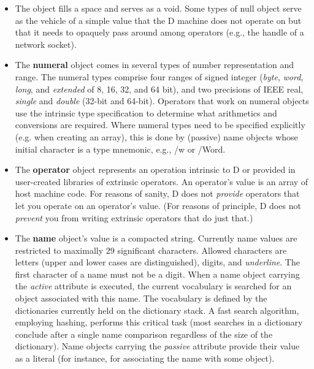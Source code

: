 \begin{itemize}

\item The  object fills a space and serves as a void. Some
  types of null object serve as the vehicle of a simple value that the
  D machine does not operate on but that it needs to opaquely pass
  around among operators (e.g., the handle of a network socket).

\item The  \textbf{numeral} object comes in several types of number representation and range. The  numeral types comprise four ranges of signed integer (\emph{byte}, \emph{word}, \emph{long}, and \emph{extended} of 8, 16, 32, and 64 bit), and two precisions of IEEE real, \emph{single} and \emph{double} (32-bit and 64-bit). Operators that work on  numeral  objects use the intrinsic type specification to determine what arithmetics and conversions are required.  Where numeral types need to  be specified explicitly (e.g. when creating an array),  this is done by (passive) name objects whose  initial character is a type mnemonic, e.g., /w or /Word.

\item The \textbf{operator} object represents an operation intrinsic to D or  provided in user-created libraries of extrinsic operators. An operator's value is an array of host machine code. For reasons of sanity, D does not \emph{provide} operators that let you operate on an operator's value. (For reasons of principle, D does not \emph{prevent} you from writing extrinsic operators that do just that.)

\item The  \textbf{name} object's value is a compacted string. Currently name values are restricted to maximally 29 significant characters. Allowed characters are letters (upper and lower cases are distinguished), digits, and \emph{underline}. The first character of a name must not be a digit. When a name  object carrying the \emph{active} attribute is executed, the current vocabulary is searched  for an object associated with this name. The vocabulary is defined by the dictionaries currently held on the dictionary stack. A fast search  algorithm,  employing hashing,  performs  this  critical task (most searches in a dictionary conclude  after  a single name comparison regardless of the size of the dictionary). Name objects carrying the \emph{passive} attribute provide their value as a literal (for instance, for associating the name with some object).


\end{itemize}
